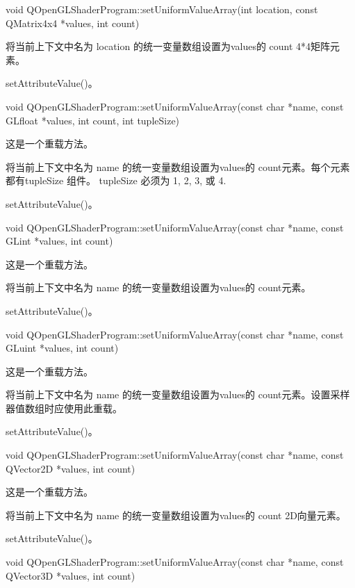 void QOpenGLShaderProgram::setUniformValueArray(int location, const QMatrix4x4 *values, int count)

将当前上下文中名为 location 的统一变量数组设置为values的 count 4*4矩阵元素。


\begin{seeAlso}
setAttributeValue()。
\end{seeAlso}

void QOpenGLShaderProgram::setUniformValueArray(const char *name, const GLfloat *values, int count, int tupleSize)

这是一个重载方法。

将当前上下文中名为 name 的统一变量数组设置为values的 count元素。每个元素都有tupleSize 组件。 tupleSize 必须为 1, 2, 3, 或 4.

\begin{seeAlso}
setAttributeValue()。
\end{seeAlso}

void QOpenGLShaderProgram::setUniformValueArray(const char *name, const GLint *values, int count)

这是一个重载方法。

将当前上下文中名为 name 的统一变量数组设置为values的 count元素。


\begin{seeAlso}
setAttributeValue()。
\end{seeAlso}

void QOpenGLShaderProgram::setUniformValueArray(const char *name, const GLuint *values, int count)

这是一个重载方法。

将当前上下文中名为 name 的统一变量数组设置为values的 count元素。设置采样器值数组时应使用此重载。

\begin{seeAlso}
setAttributeValue()。
\end{seeAlso}

void QOpenGLShaderProgram::setUniformValueArray(const char *name, const QVector2D *values, int count)

这是一个重载方法。

将当前上下文中名为 name 的统一变量数组设置为values的 count 2D向量元素。


\begin{seeAlso}
setAttributeValue()。
\end{seeAlso}

void QOpenGLShaderProgram::setUniformValueArray(const char *name, const QVector3D *values, int count)

